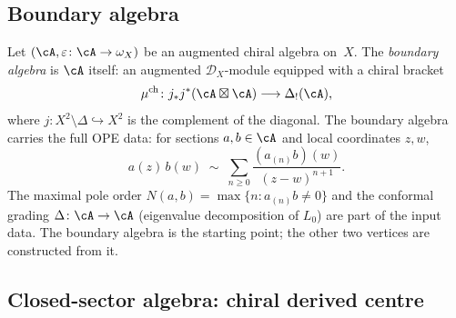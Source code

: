 \subsection{Boundary algebra}
\label{subsec:vertex-boundary}

Let $(\cA, \varepsilon \colon \cA \to \omega_X)$ be an augmented
chiral algebra on~$X$. The \emph{boundary algebra} is $\cA$ itself:
an augmented $\mathcal{D}_X$-module equipped with a chiral bracket
\begin{equation}\label{eq:supp-boundary-chiral-bracket}
\mu^{\mathrm{ch}} \colon j_* j^*(\cA \boxtimes \cA)
\longrightarrow \Delta_!(\cA),
\end{equation}
where $j \colon X^2 \setminus \Delta \hookrightarrow X^2$ is the
complement of the diagonal. The boundary algebra carries the full
OPE data: for sections $a, b \in \cA$ and local coordinates $z, w$,
\[
a(z)\, b(w) \;\sim\;
\sum_{n \geq 0} \frac{(a_{(n)} b)(w)}{(z - w)^{n+1}}.
\]
The maximal pole order $N(a,b) = \max\{n : a_{(n)}b \neq 0\}$ and
the conformal grading $\Delta \colon \cA \to \cA$ (eigenvalue
decomposition of $L_0$) are part of the input data.
The boundary algebra is the starting point; the other two vertices are
constructed from it.

\subsection{Closed-sector algebra: chiral derived centre}
\label{subsec:vertex-bulk}

